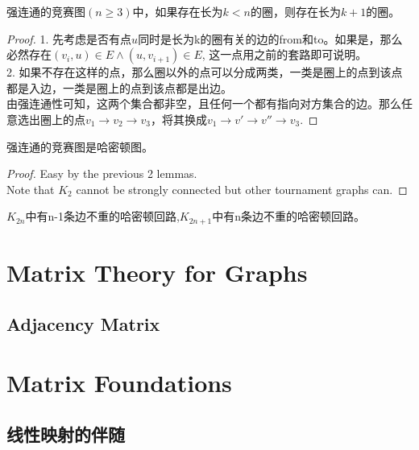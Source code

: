 \documentclass[11pt,fleqn]{book} %
\begin{document}
\begin{CJK}{UTF8}{gkai}
\begin{lemma}
    强连通的竞赛图$(n\geq 3)$中，如果存在长为$k < n$的圈，则存在长为$k+1$的圈。
\end{lemma}
\begin{proof}
    1. 先考虑是否有点$u$同时是长为k的圈有关的边的from和to。如果是，那么必然存在$(v_i,u) \in E \wedge (u, v_{i+1}) \in E$, 这一点用之前的套路即可说明。\\
    2. 如果不存在这样的点，那么圈以外的点可以分成两类，一类是圈上的点到该点都是入边，一类是圈上的点到该点都是出边。\\
    由强连通性可知，这两个集合都非空，且任何一个都有指向对方集合的边。那么任意选出圈上的点$v_1 \to v_2\to v_3$，将其换成$v_1 \to v' \to v'' \to v_3$.
\end{proof}

\begin{theorem}
    强连通的竞赛图是哈密顿图。
\end{theorem}
\begin{proof}
    Easy by the previous 2 lemmas. \\
    Note that $K_2$ cannot be strongly connected but other tournament graphs can.
\end{proof}

\begin{theorem}
    $K_{2n}$中有n-1条边不重的哈密顿回路,$K_{2n+1}$中有n条边不重的哈密顿回路。
\end{theorem}
\chapter{Matrix Theory for Graphs}
\section{Adjacency Matrix}

\def\x{\times}

\chapter{Matrix Foundations}

\section{线性映射的伴随}


\end{CJK}
\end{document}
